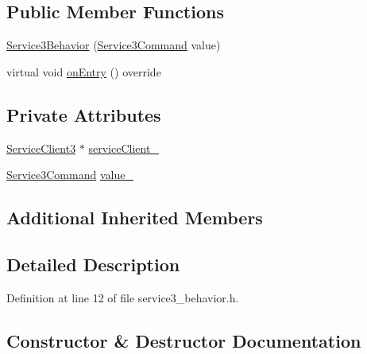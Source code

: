 \subsection*{Public Member Functions}
\begin{DoxyCompactItemize}
\item 
\hyperlink{classsm__dance__bot_1_1Service3Behavior_a26ffa9c2dab54432c5781df20fa0275c}{Service3\+Behavior} (\hyperlink{namespacesm__dance__bot_a2d0902aa29698165effd2c3248a9c8ff}{Service3\+Command} value)
\item 
virtual void \hyperlink{classsm__dance__bot_1_1Service3Behavior_a865256f9d383977aa2a8666678f402bc}{on\+Entry} () override
\end{DoxyCompactItemize}
\subsection*{Private Attributes}
\begin{DoxyCompactItemize}
\item 
\hyperlink{classsm__dance__bot_1_1ServiceClient3}{Service\+Client3} $\ast$ \hyperlink{classsm__dance__bot_1_1Service3Behavior_afe77243f8c5938cf9c754897d41cceff}{service\+Client\+\_\+}
\item 
\hyperlink{namespacesm__dance__bot_a2d0902aa29698165effd2c3248a9c8ff}{Service3\+Command} \hyperlink{classsm__dance__bot_1_1Service3Behavior_a85d2c6056f1cc77bcfc0139c4ce71ba9}{value\+\_\+}
\end{DoxyCompactItemize}
\subsection*{Additional Inherited Members}


\subsection{Detailed Description}


Definition at line 12 of file service3\+\_\+behavior.\+h.



\subsection{Constructor \& Destructor Documentation}
